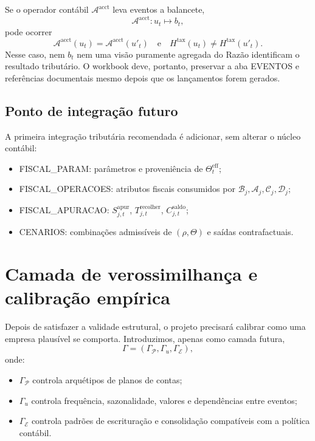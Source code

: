\documentclass[11pt,a4paper]{article}
\newcommand{\cB}{\mathcal{B}}
\newcommand{\cA}{\mathcal{A}}
\newcommand{\cC}{\mathcal{C}}
\newcommand{\cD}{\mathcal{D}}
\newcommand{\Plano}{\mathcal{P}}
\newcommand{\cE}{\mathcal{E}}
\begin{document}
Se o operador contábil $\mathcal A^{\mathrm{acct}}$ leva eventos a balancete,
\[
\mathcal A^{\mathrm{acct}}:u_t\mapsto b_t,
\]
pode ocorrer
\[
\mathcal A^{\mathrm{acct}}(u_t)=\mathcal A^{\mathrm{acct}}(u'_t)
\quad\text{e}\quad
H^{\mathrm{tax}}(u_t)\ne H^{\mathrm{tax}}(u'_t).
\]
Nesse caso, nem $b_t$ nem uma visão puramente agregada do Razão identificam o resultado tributário. O workbook deve, portanto, preservar a aba EVENTOS e referências documentais mesmo depois que os lançamentos forem gerados.

\subsection{Ponto de integração futuro}

A primeira integração tributária recomendada é adicionar, sem alterar o núcleo contábil:
\begin{itemize}
    \item FISCAL\_PARAM: parâmetros e proveniência de $\Theta_t^{\mathrm{eff}}$;
    \item FISCAL\_OPERACOES: atributos fiscais consumidos por $\cB_j,\cA_j,\cC_j,\cD_j$;
    \item FISCAL\_APURACAO: $S_{j,t}^{\mathrm{apur}}$, $T_{j,t}^{\mathrm{recolher}}$, $C_{j,t}^{\mathrm{saldo}}$;
    \item CENARIOS: combinações admissíveis de $(\rho,\Theta)$ e saídas contrafactuais.
\end{itemize}

\section{Camada de verossimilhança e calibração empírica}

Depois de satisfazer a validade estrutural, o projeto precisará calibrar como uma empresa plausível se comporta. Introduzimos, apenas como camada futura,
\begin{equation}
\boxed{
\Gamma=(\Gamma_{\Plano},\Gamma_u,\Gamma_{\cE}),
}
\end{equation}
onde:
\begin{itemize}
    \item $\Gamma_{\Plano}$ controla arquétipos de planos de contas;
    \item $\Gamma_u$ controla frequência, sazonalidade, valores e dependências entre eventos;
    \item $\Gamma_{\cE}$ controla padrões de escrituração e consolidação compatíveis com a política contábil.
\end{itemize}
\end{document}
